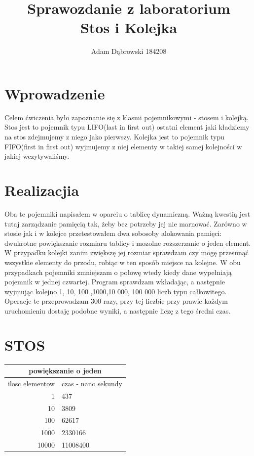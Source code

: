\documentclass[a4paper,11pt]{report}
\title{\textbf{Sprawozdanie z laboratorium\\Stos i Kolejka}}
\author{Adam Dąbrowski 184208}
\begin{document}
\maketitle
\section{Wprowadzenie}

Celem ćwiczenia było zapoznanie się z klasmi pojemnikowymi - stosem i kolejką. Stos jest to pojemnik typu LIFO(last in first out) ostatni element jaki kładziemy na stos zdejmujemy z niego jako pierwszy. Kolejka jest to pojemnik typu FIFO(first in first out) wyjmujemy z niej elementy w takiej samej kolejności w jakiej wczytywaliśmy.  

\section{Realizacjia}

Oba te pojemniki napisałem w oparciu o tablicę dynamiczną. Ważną kwestią jest tutaj zarządzanie pamięcią tak, żeby bez potrzeby jej nie marnować. 
Zarówno w stosie jak i w kolejce przetestowałem dwa sobosoby alokowania pamięci: dwukrotne powiększanie rozmiaru tablicy i mozolne rozszerzanie o jeden element. W przypadku kolejki zanim zwiększę jej rozmiar sprawdzam czy mogę przesunąć wszystkie elementy do przodu, robiąc w ten sposób miejsce na kolejne. W obu przypadkach pojemniki zmniejszam o połowę wtedy kiedy dane wypełniają pojemnik w jednej czwartej. Program sprawdzam wkładając, a następnie wyjmując kolejno 1, 10, 100 ,1000,10 000, 100 000 liczb typu całkowitego. Operacje te przeprowadzam 300 razy, przy tej liczbie przy prawie każdym uruchomieniu dostaję podobne wyniki, a następnie liczę z tego średni czas. 
\newpage
\section{STOS}
\begin{tabular}{|rl|}
\hline
\multicolumn{2}{|c|}{powiększanie o jeden}\\
\hline
ilosc elementow & czas - nano sekundy\\
\hline
1&437\\
10&3809\\
100&62617\\
1000&2330166\\
10000&11008400\\
\hline
\end{tabular}
\end{document}
